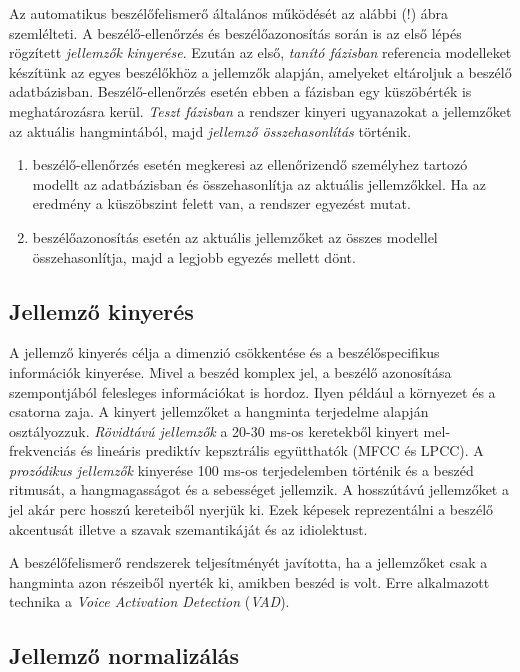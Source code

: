 Az automatikus beszélőfelismerő általános működését az alábbi (!) ábra szemlélteti. A beszélő-ellenőrzés és beszélőazonosítás során is az első lépés rögzített \emph{jellemzők kinyerése}. Ezután az első, \emph{tanító fázisban} referencia modelleket készítünk az egyes beszélőkhöz a jellemzők alapján, amelyeket eltároljuk a beszélő adatbázisban. Beszélő-ellenőrzés esetén ebben a fázisban egy küszöbérték is meghatározásra kerül. \emph{Teszt fázisban} a rendszer kinyeri ugyanazokat a jellemzőket az aktuális hangmintából, majd \emph{jellemző összehasonlítás} történik.

\begin{enumerate}
	\item beszélő-ellenőrzés esetén megkeresi az ellenőrizendő személyhez tartozó modellt az adatbázisban és összehasonlítja az aktuális jellemzőkkel. Ha az eredmény a küszöbszint felett van, a rendszer egyezést mutat.
	\item beszélőazonosítás esetén az aktuális jellemzőket az összes modellel összehasonlítja, majd a legjobb egyezés mellett dönt. 
\end{enumerate}

\subsection{Jellemző kinyerés}
A jellemző kinyerés célja a dimenzió csökkentése és a beszélőspecifikus információk kinyerése. Mivel a beszéd komplex jel, a beszélő azonosítása szempontjából felesleges információkat is hordoz. Ilyen például a környezet és a csatorna zaja. A kinyert jellemzőket a hangminta terjedelme alapján osztályozzuk. \emph{Rövidtávú jellemzők} a 20-30 ms-os keretekből kinyert mel-frekvenciás és lineáris prediktív kepsztrális együtthatók (MFCC és LPCC). A \emph{prozódikus jellemzők} kinyerése 100 ms-os terjedelemben történik és a beszéd ritmusát, a hangmagasságot és a sebességet jellemzik. A hosszútávú jellemzőket a jel akár perc hosszú kereteiből nyerjük ki. Ezek képesek reprezentálni a beszélő akcentusát illetve a szavak szemantikáját és az idiolektust.

A beszélőfelismerő rendszerek teljesítményét javította, ha a jellemzőket csak
a hangminta azon részeiből nyerték ki, amikben beszéd is volt. Erre alkalmazott technika a \emph{Voice Activation Detection} (\emph{VAD}).

\subsection{Jellemző normalizálás}

